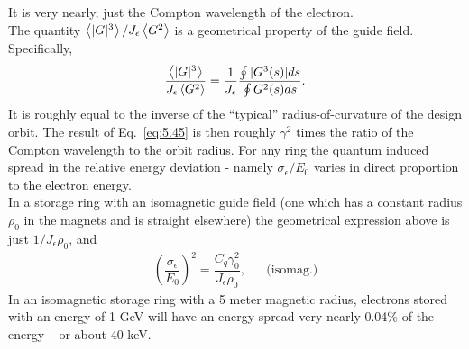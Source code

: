 It is very nearly, just the Compton wavelength of the electron.\\
The quantity $\left< |G|^3 \right>/J_\epsilon \left< G^2 \right>$ is a geometrical property of the guide field. Specifically,
\begin{align}
	\dfrac{\left< |G|^3 \right>}{J_\epsilon \left< G^2 \right>} = \dfrac{1}{J_\epsilon} \dfrac{\oint |G^3(s)|ds}{\oint G^2(s) ds}.
\end{align}
It is roughly equal to the inverse of the ``typical'' radius-of-curvature of the design orbit. The result of Eq.~\eqref{eq:5.45} is then roughly $\gamma^2$ times the ratio of the Compton wavelength to the orbit radius. For any ring the quantum induced spread in the relative energy deviation - namely $\sigma_\epsilon/E_0$ varies in direct proportion to the electron energy.\\
In a storage ring with an isomagnetic guide field (one which has a constant radius $\rho_0$ in the magnets and is straight elsewhere) the geometrical expression above is just $1/J_\epsilon \rho_0$, and
\begin{align}\label{eq:5.48}
	\left( \dfrac{\sigma_\epsilon}{E_0}\right)^2 = \dfrac{C_q \gamma_0^2}{J_\epsilon \rho_0}, && \text{(isomag.)}
\end{align}
In an isomagnetic storage ring with a 5 meter magnetic radius, electrons stored with an energy of 1 GeV will have an energy spread very nearly 0.04\% of the energy -- or about 40 keV.

